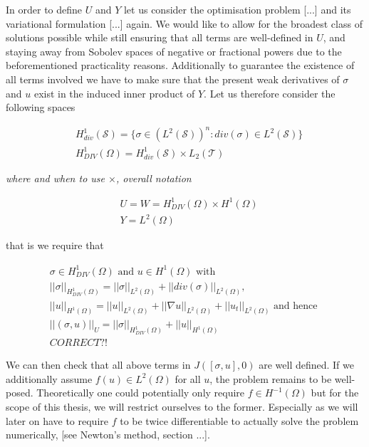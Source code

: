 \documentclass[../draft_1.tex]{subfiles}
\begin{document}
In order to define $U$ and $Y$ let us consider the optimisation problem [...] and its variational formulation [...] again. We would like to allow for the broadest class of solutions possible while still ensuring that all terms are well-defined in $U$, and staying away from Sobolev spaces of negative or fractional powers due to the beforementioned practicality reasons. Additionally to guarantee the existence of all terms involved we have to make sure that the present weak derivatives of $\sigma$ and $u$ exist in the induced inner product of $Y$. Let us therefore consider the following spaces 
\begin{ceqn}
	\begin{align}
	&H_{div}^1(\mathcal{S}) = \{\sigma \in (L^2(\mathcal{S}))^n : div (\sigma) \in L^2(\mathcal{S})\} \\
    &H_{DIV}^1(\Omega) = H_{div}^1(\mathcal{S}) \times L_2(\mathcal{T}) 
    	\end{align}
\end{ceqn}
\textit{where and when to use $\times$, overall notation}
\begin{ceqn}
	\begin{align}
    & U = W = H_{DIV}^1(\Omega) \times H^1(\Omega) \\
    & Y = L^2(\Omega)
	\end{align}
\end{ceqn}
that is we require that 
\begin{ceqn}
	\begin{align}
	\label{spacesLS}
\sigma \in H_{DIV}^1(\Omega) \text{  and  } u \in H^1(\Omega) \text { with } \\
|| \sigma ||_{H_{DIV}^1(\Omega)} = || \sigma ||_{L^2(\Omega)} + || div(\sigma) ||_{L^2(\Omega)}, \\
 ||u ||_{H^1(\Omega)} = || u ||_{L^2(\Omega)} + || \nabla u ||_{L^2(\Omega)} + || u_t ||_{L^2(\Omega)} \text{ and hence } \\
 || (\sigma, u) ||_U = || \sigma ||_{H_{DIV}^1(\Omega)} + || u ||_{H^1(\Omega)} \\
 CORRECT ?!
	\end{align}
\end{ceqn}
We can then check that all above terms in $J([\sigma, u], 0)$ are well defined. If we additionally assume $f(u) \in L^2(\Omega)$ for all $u$, the problem remains to be well-posed. Theoretically one could potentially only require $f \in H^{-1}(\Omega)$ but for the scope of this thesis, we will restrict ourselves to the former. Especially as we will later on have to require $f$ to be twice differentiable to actually solve the problem numerically, [see Newton's method, section ...].\\
\end{document}
